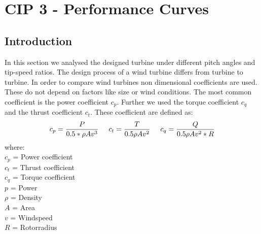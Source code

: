 \documentclass[10pt]{article}
\begin{document}
\newpage
\section{CIP 3 - Performance Curves}
\subsection{Introduction}
In this section we analysed the designed turbine under different pitch angles and tip-speed ratios. The design process of a wind turbine differs from turbine to turbine. In order to compare wind turbines non dimensional coefficients are used. These do not depend on factors like size or wind conditions. The most common coefficient is the power coefficient $c_p$. Further we used the torque coefficient $c_q$ and the thrust coefficient $c_t$.
These coefficient are defined as:
\begin{align*}
c_p = \frac{P}{0.5 *\rho A v^3}\hspace{0.5cm}c_t =  \frac{T}{0.5\rho A v^2}\hspace{0.5cm}c_q = \frac{Q}{0.5\rho A v^2*R}\\
\end{align*}
where:\\
$c_p$ = Power coefficient\\
$c_t$ = Thrust coefficient\\
$c_q$ = Torque coefficient\\
$p$   = Power\\
$\rho$ = Density\\
$A$    = Area\\
$v$	   = Windspeed\\
$R$		= Rotorradius
\end{document}
